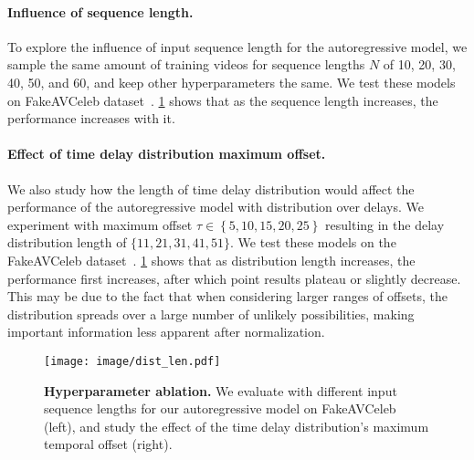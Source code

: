 \documentclass[10pt,twocolumn,letterpaper]{article}
\newcommand{\mypar}[1]{\vspace{-3mm}\paragraph{#1}}
\def\upvspacefig{\vspace{-0.0mm}}
\begin{document}
\mypar{Influence of sequence length.}
To explore the influence of input sequence length for the autoregressive model, we sample the same amount of training videos for sequence lengths $N$ of 10, 20, 30, 40, 50, and 60, and keep other hyperparameters the same. We test these models on FakeAVCeleb dataset~\cite{NEURIPS_DATASETS_AND_BENCHMARKS2021_d9d4f495}. \cref{clip_size_fig} shows that as the sequence length increases, the performance increases with it. 





\mypar{Effect of time delay distribution maximum offset.}
We also study how the length of time delay distribution would affect the performance of the autoregressive model with distribution over delays. We experiment with maximum offset $\tau \in \left \{ 5, 10, 15, 20, 25 \right \}$ resulting in the delay distribution length of $\{11, 21, 31, 41, 51\}$. We test these models on the FakeAVCeleb dataset~\cite{NEURIPS_DATASETS_AND_BENCHMARKS2021_d9d4f495}. \cref{clip_size_fig} shows that as distribution length increases, the performance first increases, after which point results plateau or slightly decrease. This may be due to the fact that when considering larger ranges of offsets, the distribution spreads over a large number of unlikely possibilities, making important information less apparent after normalization.


\begin{figure}[t!]
    \centering
    \upvspacefig
    \texttt{[image: image/dist\_len.pdf]}
    \caption{\textbf{Hyperparameter ablation.} 
    We evaluate with different input sequence lengths for our autoregressive model on FakeAVCeleb (left), and study the effect of the time delay distribution's maximum temporal offset (right).} 
    \label{clip_size_fig}
\end{figure} 







 
\end{document}
